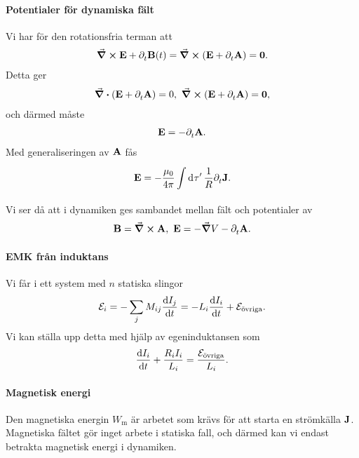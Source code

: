 \paragraph{Potentialer för dynamiska fält}
Vi har för den rotationsfria terman att
\begin{align*}
	\curl{\vb{E}} + \partial_{t}^{}\vb{B}(t) = \curl(\vb{E} + \partial_{t}^{}\vb{A}) = \vb{0}.
\end{align*}
Detta ger
\begin{align*}
	\div(\vb{E} + \partial_{t}^{}\vb{A}) = 0,\ \curl(\vb{E} + \partial_{t}^{}\vb{A}) = \vb{0},
\end{align*}
och därmed måste
\begin{align*}
	\vb{E} = -\partial_{t}^{}\vb{A}.
\end{align*}
Med generaliseringen av $\vb{A}$ fås
\begin{align*}
	\vb{E} = -\frac{\mu_{0}}{4\pi}\int\limits_{}^{}\dd[]{\tau'}\frac{1}{R}\partial_{t}^{}\vb{J}.
\end{align*}
Vi ser då att i dynamiken ges sambandet mellan fält och potentialer av
\begin{align*}
	\vb{B} = \curl{\vb{A}},\ \vb{E} = -\grad{V} - \partial_{t}^{}\vb{A}.
\end{align*}

\paragraph{EMK från induktans}
Vi får i ett system med $n$ statiska slingor
\begin{align*}
	\mathcal{E}_{i} = -\sum\limits_{j}M_{ij}\dv{I_{j}}{t} = -L_{i}\dv{I_{i}}{t} + \mathcal{E}_{\text{övriga}}.
\end{align*}
Vi kan ställa upp detta med hjälp av egeninduktansen som
\begin{align*}
	\dv{I_{i}}{t} + \frac{R_{i}I_{i}}{L_{i}} = \frac{\mathcal{E}_{\text{övriga}}}{L_{i}}.
\end{align*}

\paragraph{Magnetisk energi}
Den magnetiska energin $W_{\text{m}}$ är arbetet som krävs för att starta en strömkälla $\vb{J}$. Magnetiska fältet gör inget arbete i statiska fall, och därmed kan vi endast betrakta magnetisk energi i dynamiken.

